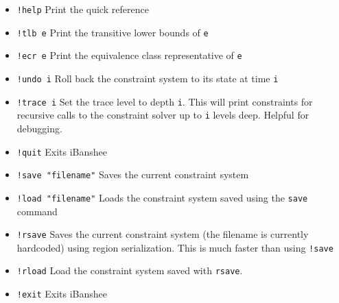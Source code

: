 \documentclass{article}
\begin{document}
\begin{itemize}
\item \texttt{!help} Print the quick reference
\item \texttt{!tlb e} Print the transitive lower bounds of \texttt{e}
\item \texttt{!ecr e} Print the equivalence class representative of \texttt{e}
\item \texttt{!undo i} Roll back the constraint system to its state at time \texttt{i}
\item \texttt{!trace i} Set the trace level to depth \texttt{i}. This will print constraints for recursive calls to the constraint solver up to \texttt{i} levels deep. Helpful for debugging.
\item \texttt{!quit} Exits iBanshee
\item \texttt{!save "filename"} Saves the current constraint system
\item \texttt{!load "filename"} Loads the constraint system saved using the \texttt{save} command
\item \texttt{!rsave} Saves the current constraint system (the filename is currently hardcoded) using region serialization. This is much faster than using \texttt{!save}
\item \texttt{!rload} Load the constraint system saved with
  \texttt{rsave}.
\item \texttt{!exit} Exits iBanshee
\end{itemize}


\end{document}
